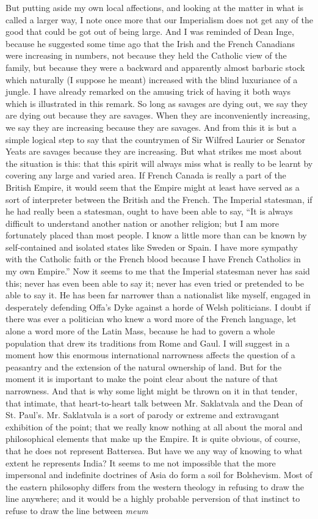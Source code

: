 \documentclass{book}
\begin{document}
But putting aside my own local affections, and looking at the matter in what is called a larger way, I note once more that our Imperialism does not get any of the good that could be got out of being large. And I was reminded of Dean Inge, because he suggested some time ago that the Irish and the French Canadians were increasing in numbers, not because they held the Catholic view of the family, but because they were a backward and apparently almost barbaric stock which naturally (I suppose he meant) increased with the blind luxuriance of a jungle. I have already remarked on the amusing trick of having it both ways which is illustrated in this remark. So long as savages are dying out, we say they are dying out because they are savages. When they are inconveniently increasing, we say they are increasing because they are savages. And from this it is but a simple logical step to say that the countrymen of Sir Wilfred Laurier or Senator Yeats are savages because they are increasing. But what strikes me most about the situation is this: that this spirit will always miss what is really to be learnt by covering any large and varied area. If French Canada is really a part of the British Empire, it would seem that the Empire might at least have served as a sort of interpreter between the British and the French. The Imperial statesman, if he had really been a statesman, ought to have been able to say, “It is always difficult to understand another nation or another religion; but I am more fortunately placed than most people. I know a little more than can be known by self-contained and isolated states like Sweden or Spain. I have more sympathy with the Catholic faith or the French blood because I have French Catholics in my own Empire.” Now it seems to me that the Imperial statesman never has said this; never has even been able to say it; never has even tried or pretended to be able to say it. He has been far narrower than a nationalist like myself, engaged in desperately defending Offa’s Dyke against a horde of Welsh politicians. I doubt if there was ever a politician who knew a word more of the French language, let alone a word more of the Latin Mass, because he had to govern a whole population that drew its traditions from Rome and Gaul. I will suggest in a moment how this enormous international narrowness affects the question of a peasantry and the extension of the natural ownership of land. But for the moment it is important to make the point clear about the nature of that narrowness. And that is why some light might be thrown on it in that tender, that intimate, that heart-to-heart talk between Mr. Saklatvala and the Dean of St. Paul’s. Mr. Saklatvala is a sort of parody or extreme and extravagant exhibition of the point; that we really know nothing at all about the moral and philosophical elements that make up the Empire. It is quite obvious, of course, that he does not represent Battersea. But have we any way of knowing to what extent he represents India? It seems to me not impossible that the more impersonal and indefinite doctrines of Asia do form a soil for Bolshevism. Most of the eastern philosophy differs from the western theology in refusing to draw the line anywhere; and it would be a highly probable perversion of that instinct to refuse to draw the line between \emph{meum} 
\end{document}
